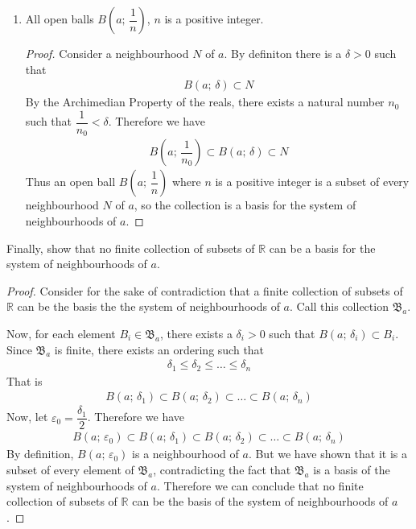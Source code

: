 \documentclass{article}
\begin{document}
\begin{enumerate}[label=\roman*)]
    \item All open balls $B\left(a;\,\dfrac{1}{n}\right)$, $n$ is a positive integer.
    
    \begin{proof}
        Consider a neighbourhood $N$ of $a$. By definiton there is a $\delta > 0$ such that
        \begin{align*}
            B(a;\,\delta) \subset N
        \end{align*}
        By the Archimedian Property of the reals, there exists a natural number $n_0$ such that $\dfrac{1}{n_0} < \delta$. Therefore we have
        \begin{align*}
            B\left(a;\,\dfrac{1}{n_0}\right) \subset B(a;\,\delta) \subset N
        \end{align*}
        Thus an open ball $B\left(a;\,\dfrac{1}{n}\right)$ where $n$ is a positive integer is a subset of every neighbourhood $N$ of $a$,
        so the collection is a basis for the system of neighbourhoods of $a$. 
    \end{proof}
\end{enumerate}

Finally, show that no finite collection of subsets of $\mathbb{R}$ can be a basis for the system of neighbourhoods of $a$.

\begin{proof}
    Consider for the sake of contradiction that a finite collection of subsets of $\mathbb{R}$ can be the basis the the system of
    neighbourhoods of $a$. Call this collection $\mathfrak{B}_a$.
    
    Now, for each element $B_i \in \mathfrak{B}_a$, there exists a $\delta_i > 0$ such that $B(a;\,\delta_i) \subset B_i$.
    Since $\mathfrak{B}_a$ is finite, there exists an ordering such that
    \begin{align*}
        \delta_1 \le \delta_2 \le \dots \le \delta_n
    \end{align*}
    That is
    \begin{align*}
        B(a;\,\delta_1) \subset B(a;\,\delta_2) \subset \dots \subset B(a;\,\delta_n)
    \end{align*}
    Now, let $\varepsilon_0 = \dfrac{\delta_1}{2}$. Therefore we have
    \begin{align*}
        B(a;\,\varepsilon_0) \subset B(a;\,\delta_1) \subset B(a;\,\delta_2) \subset \dots \subset B(a;\,\delta_n)
    \end{align*}
    By definition, $B(a;\,\varepsilon_0)$ is a neighbourhood of $a$. But we have shown that it is a subset of every element of 
    $\mathfrak{B}_a$, contradicting the fact that $\mathfrak{B}_a$ is a basis of the system of neighbourhoods of $a$. Therefore
    we can conclude that no finite collection of subsets of $\mathbb{R}$ can be the basis of the system of neighbourhoods of $a$.
\end{proof}
\pagebreak
\end{document}
